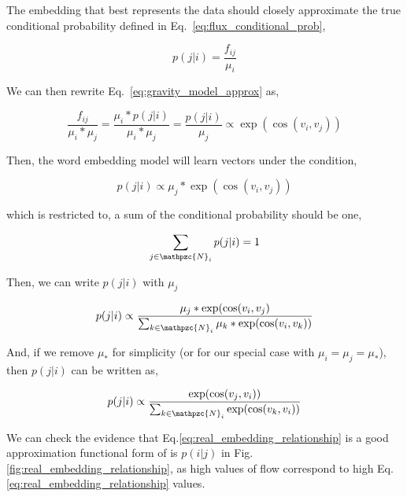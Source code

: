 \documentclass[12pt]{article} %
\begin{document}
The embedding that best represents the data should closely approximate the true conditional probability defined in
Eq.~\ref{eq:flux_conditional_prob},

\begin{equation}
    \label{eq:flux_conditional_prob}
    p(j|i) = \frac{f_{ij}}{\mu_i}
\end{equation}

We can then rewrite Eq.~\ref{eq:gravity_model_approx} as,

\begin{equation}
    \label{eq:gravity_relationship}
    \frac{f_{ij}}{\mu_i * \mu_j} = \frac{\mu_i * p(j|i)}{\mu_i * \mu_j} =  \frac{p(j|i)}{\mu_j} \propto \exp(\cos(v_i,v_j))
\end{equation}

Then, the word embedding model will learn vectors under the condition,

\begin{equation}
    \label{eq:conditional probability}
      p(j|i) \propto {\mu_j}* \exp(\cos(v_i,v_j))
\end{equation}

which is restricted to, a sum of the conditional probability should be one,

\begin{equation}
    \label{eq:sum of the conditional probabiitliy}
    \sum_{j\in\mathpzc{N}_i} p(j|i) = 1
\end{equation}

Then, we can write $p(j|i)$ with $\mu_{j}$

\begin{equation}
    p(j|i) \propto \frac{{\mu_j}* \exp(\cos(v_i,v_j)}{\sum_{k\in\mathpzc{N}_i} {\mu_k}* \exp(\cos(v_i,v_k))}
\end{equation}

And, if we remove ${\mu_*}$ for simplicity (or for our special case with $\mu_{i} = \mu_{j} = \mu_*$), then $p(j|i)$ can be written as,

\begin{equation}
    \label{eq:real_embedding_relationship}
    p(j|i) \propto \frac{\exp(\cos(v_j, v_i))}{\sum_{k\in\mathpzc{N}_i} \exp(\cos(v_k,v_i))}
\end{equation}

We can check the evidence that Eq.\ref{eq:real_embedding_relationship} is a good approximation functional form of is $p(i|j)$ in Fig. \ref{fig:real_embedding_relationship}, as high values of flow correspond to high Eq.\ref{eq:real_embedding_relationship} values.
\end{document}
